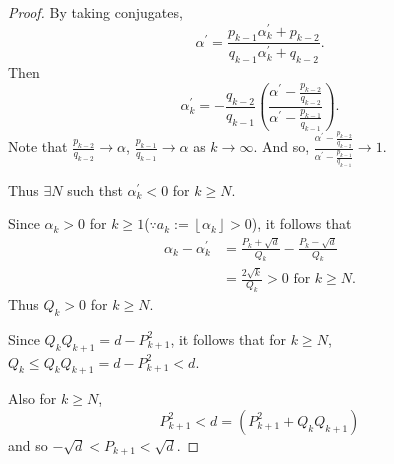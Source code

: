 \begin{proof}
    By taking conjugates,
    \[
        \alpha^\prime = \frac{p_{k-1}\alpha^\prime_k+p_{k-2}}{q_{k-1}\alpha^\prime_k+q_{k-2}}.
    \]
    Then
    \[
        \alpha_k^\prime = -\frac{q_{k-2}}{q_{k-1}}
        \left(\frac
            {\alpha^\prime -\frac{p_{k-2}}{q_{k-2}}}
            {\alpha^\prime -\frac{p_{k-1}}{q_{k-1}}}
        \right).
    \]
    Note that $\frac{p_{k-2}}{q_{k-2}} \rightarrow \alpha$,
    $\frac{p_{k-1}}{q_{k-1}} \rightarrow \alpha$ as $k \rightarrow \infty$. And so,
    $\frac
    {\alpha^\prime -\frac{p_{k-2}}{q_{k-2}}}
    {\alpha^\prime -\frac{p_{k-1}}{q_{k-1}}} \rightarrow 1$.

    Thus $\exists N$ such thst $\alpha_k^\prime < 0$ for $k \geq N$.

    Since $\alpha_k>0$ for $k \geq 1$($\because a_k:=\left\lfloor\alpha_k\right\rfloor>0$), 
    it follows that
    \begin{align*}
        \alpha_k-\alpha_k^\prime &= \frac{P_k+\sqrt{d}}{Q_k} - \frac{P_k-\sqrt{d}}{Q_k} \\
        &= \frac{2\sqrt{k}}{Q_k} > 0 \mbox{ for } k \geq N.
    \end{align*}
    Thus $Q_k>0$ for $k \geq N$.

    Since $Q_kQ_{k+1} = d-P_{k+1}^2$, it follows that for $k \geq N$, $Q_k \leq Q_kQ_{k+1} = d-P_{k+1}^2<d$.

    Also for $k \geq N$,
    \[
        P_{k+1}^2 < d = \left(P_{k+1}^2+Q_kQ_{k+1}\right)
    \]
    and so $-\sqrt{d}<P_{k+1}<\sqrt{d}$.
\end{proof}